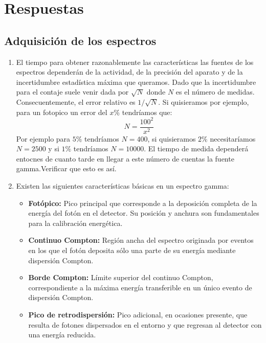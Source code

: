 \documentclass[11pt]{article}
\begin{document}

\newpage

\section{Respuestas}


\subsection{Adquisición de los espectros}
\begin{enumerate}[label=\alph*)]
    \item El tiempo para obtener razonablemente las características las fuentes de los espectros dependerán de la actividad, de la precisión del aparato y de la incertidumbre estadística máxima que queramos. Dado que la incertidumbre para el contaje suele venir dada por $\sqrt{N}$ donde $N$ es el número de medidas. Consecuentemente, el error relativo es $1/\sqrt{N}$. Si quisieramos por ejemplo, para un fotopico un error del $x\%$ tendríamos que:
    \begin{equation}
        N = \frac{100^2}{x^2}
    \end{equation}
    Por ejemplo para $5\%$ tendríamos $N=400$, si quisieramos $2\%$ necesitaríamos $N=2500$ y si $1\%$ tendríamos $N=10000$. El tiempo de medida dependerá entocnes de cuanto tarde en llegar a este número de cuentas la fuente gamma.\textcolor{BrickRed}{Verificar que esto es así.}
    \item Existen las siguientes características básicas en un espectro gamma:
    \begin{itemize}
        \item \textbf{Fotópico:} Pico principal que corresponde a la deposición completa de la energía del fotón en el detector. Su posición y anchura son fundamentales para la calibración energética.
        \item \textbf{Continuo Compton:} Región ancha del espectro originada por eventos en los que el fotón deposita sólo una parte de su energía mediante dispersión Compton.
        \item \textbf{Borde Compton:} Límite superior del continuo Compton, correspondiente a la máxima energía transferible en un único evento de dispersión Compton.
        \item \textbf{Pico de retrodispersión:} Pico adicional, en ocasiones presente, que resulta de fotones dispersados en el entorno y que regresan al detector con una energía reducida.

\end{itemize}
\end{enumerate}
\end{document}
